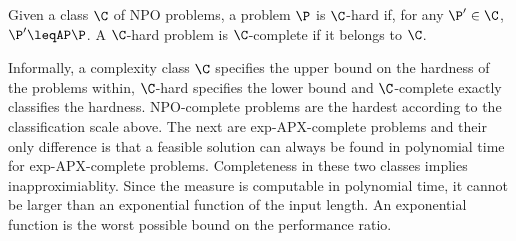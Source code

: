 \begin{definition}\label{def:complete} Given a class $\C$ of NPO problems, a problem $\P$ is $\C$-hard if, for any $\P' \in \C$, $\P' \leqAP \P$. A $\C$-hard problem is $\C$-complete if it belongs to $\C$.
\end{definition}
Informally, a complexity class $\C$ specifies the upper bound on the hardness of the problems within, $\C$-hard specifies the lower bound and $\C$-complete exactly classifies the hardness. NPO-complete problems are the hardest according to the classification scale above. The next are exp-APX-complete problems and their only difference is that a feasible solution can always be found in polynomial time for exp-APX-complete problems. Completeness in these two classes implies inapproximiablity. Since the measure is computable in polynomial time, it cannot be larger than an exponential function of the input length. An exponential function is the worst possible bound on the performance ratio.